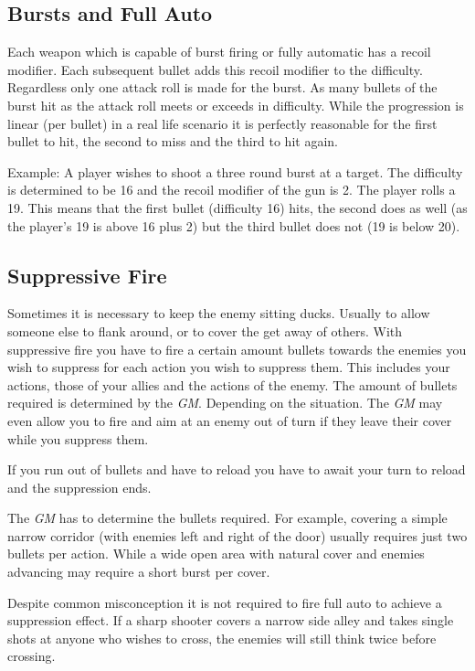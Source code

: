\subsection{Bursts and Full Auto}
\label{sub:6-Bursts and Full Auto}

Each weapon which is capable of burst firing or fully automatic has a recoil
modifier. Each subsequent bullet adds this recoil modifier to the difficulty.
Regardless only one attack roll is made for the burst. As many bullets of the
burst hit as the attack roll meets or exceeds in difficulty. While the
progression is linear (per bullet) in a real life scenario it is perfectly
reasonable for the first bullet to hit, the second to miss and the third to
hit again.

Example: A player wishes to shoot a three round burst at a target. The
difficulty is determined to be 16 and the recoil modifier of the gun is 2.
The player rolls a 19. This means that the first bullet (difficulty 16) hits,
the second does as well (as the player's 19 is above 16 plus 2) but the third
bullet does not (19 is below 20).

\subsection{Suppressive Fire}
\label{sub:6-Suppressive Fire}

Sometimes it is necessary to keep the enemy sitting ducks. Usually to allow
someone else to flank around, or to cover the get away of others. With
suppressive fire you have to fire a certain amount bullets towards the
enemies you wish to suppress for each action you wish to suppress them. This
includes your actions, those of your allies and the actions of the enemy. The
amount of bullets required is determined by the \emph{GM}. Depending on the
situation. The \emph{GM} may even allow you to fire and aim at an enemy out of
turn if they leave their cover while you suppress them.

If you run out of bullets and have to reload you have to await your turn to
reload and the suppression ends.

The \emph{GM} has to determine the bullets required. For example, covering a
simple narrow corridor (with enemies left and right of the door) usually
requires just two bullets per action. While a wide open area with natural
cover and enemies advancing may require a short burst per cover.

Despite common misconception it is not required to fire full auto to achieve
a suppression effect. If a sharp shooter covers a narrow side alley and takes
single shots at anyone who wishes to cross, the enemies will still think twice
before crossing.

